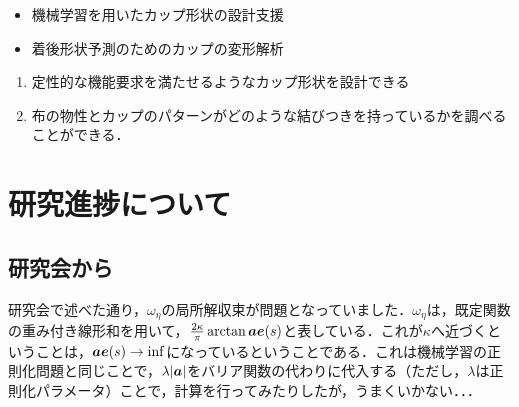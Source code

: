 \documentclass[11pt]{jsarticle}
\begin{document}
	\articleSPRabst
		\begin{itemize}
			\item 機械学習を用いたカップ形状の設計支援
			\item 着後形状予測のためのカップの変形解析
		\end{itemize}
		
		
	\articleSPRobj
		\begin{enumerate}
			\item 定性的な機能要求を満たせるようなカップ形状を設計できる
			\item 布の物性とカップのパターンがどのような結びつきを持っているかを調べることができる．
		\end{enumerate}
	\articleSPRitemsone
		
		\tableofcontents
		
		
	\articleSPRitemstwo
	\renewcommand{\labelitemi}{$\blacktriangledown$}
	\newcommand{\argmax}{\mathop{\rm arg~max}\limits}
	\newcommand{\argmin}{\mathop{\rm arg~min}\limits}
	\newcommand{\Ker}{{\rm Ker}}
	\newcommand{\rank}{{\rm rank}}
	\section{研究進捗について}
		\subsection{研究会から}
			研究会で述べた通り，$ \omega_{\eta} $の局所解収束が問題となっていました．$ \omega_{\eta} $は，既定関数の重み付き線形和を用いて，$ \frac{2 \kappa}{\pi} \arctan \boldsymbol{a} \boldsymbol{e}(s)$と表している．これが$ \kappa $へ近づくということは，$ \boldsymbol{a} \boldsymbol{e}(s) \rightarrow \inf $になっているということである．これは機械学習の正則化問題と同じことで，$ \lambda |\boldsymbol{a}| $をバリア関数の代わりに代入する（ただし，$ \lambda $は正則化パラメータ）ことで，計算を行ってみたりしたが，うまくいかない．．．
			
\end{document}
